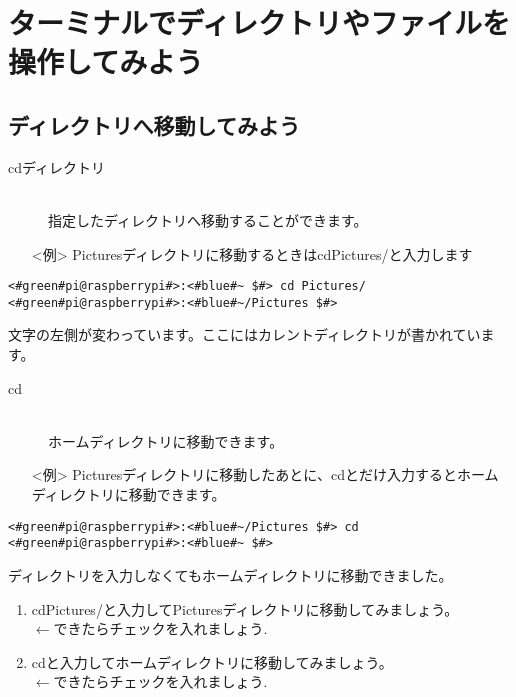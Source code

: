 \section{ターミナルでディレクトリやファイルを操作してみよう}

\subsection{ディレクトリへ移動してみよう}
\begin{description}
\item[cd\textvisiblespace ディレクトリ]\mbox{}\\
指定したディレクトリへ移動することができます。
\end{description}
\begin{itemize}
\item[<例>] Picturesディレクトリに移動するときはcd\textvisiblespace Pictures/と入力します
\end{itemize}

\begin{lstlisting}[caption=cd directoryの例, label=cdDir]
<#green#pi@raspberrypi#>:<#blue#~ $#> cd Pictures/
<#green#pi@raspberrypi#>:<#blue#~/Pictures $#>
\end{lstlisting}
文字の左側が変わっています。ここにはカレントディレクトリが書かれています。

\begin{description}
\item[cd]\mbox{}\\
ホームディレクトリに移動できます。
\end{description}
\begin{itemize}
\item[<例>] Picturesディレクトリに移動したあとに、cdとだけ入力するとホームディレクトリに移動できます。
\end{itemize}
\begin{lstlisting}[caption=cdの例, label=cd]
<#green#pi@raspberrypi#>:<#blue#~/Pictures $#> cd
<#green#pi@raspberrypi#>:<#blue#~ $#> 
\end{lstlisting}
ディレクトリを入力しなくてもホームディレクトリに移動できました。\\

\begin{tcolorbox}[title=\useOmetoi]
\begin{enumerate}
\item cd\textvisiblespace Pictures/と入力してPicturesディレクトリに移動してみましょう。\\
\fbox{\phantom{白}} $\leftarrow$できたらチェックを入れましょう.
\item cdと入力してホームディレクトリに移動してみましょう。\\
\fbox{\phantom{白}} $\leftarrow$できたらチェックを入れましょう.
\end{enumerate}
\end{tcolorbox}